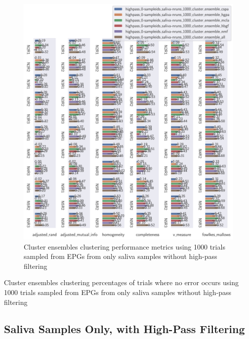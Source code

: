 \begin{theappendices}
\begin{figure}[htbp]
\centering
\includegraphics[width=\textwidth]{./figures/clust_comparison/highpass_0-sampleids_saliva-nruns_1000_cluster_ensembles.pdf}
\caption{Cluster ensembles clustering performance metrics using 1000 trials sampled from EPGs from only saliva samples without high-pass filtering}
\label{appendix:fig:highpass_0-sampleids_saliva-nruns_1000_cluster_ensembles}
\end{figure}

\begin{table}[htbp]
\centering
{}
\caption{Cluster ensembles clustering percentages of trials where no error occurs using 1000 trials sampled from EPGs from only saliva samples without high-pass filtering}
\label{appendix:table:highpass_0-sampleids_saliva-nruns_1000_cluster_ensembles}
\end{table}

\FloatBarrier
\subsection{Saliva Samples Only, with High-Pass Filtering}


\end{theappendices}
